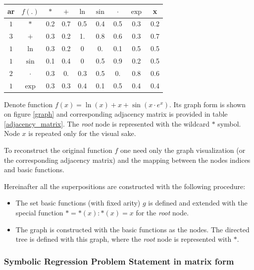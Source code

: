 \documentclass[11pt, tightenlines, twoside, onecolumn, nofloats, nobibnotes, nofootinbib, superscriptaddress, noshowpacks, centertags]{revtex4}
\begin{document}
\begin{minipage}[B]{0.35\textwidth}
    \centering
        \begin{tabular}{|c|c||c|c|c|c|c|c|c|}
            \hline
            ar&$f(.)$&$\ast$&$+$&$\ln$&$\sin$&$\cdot$&$\exp$&x\\
            \hline
            $1$&$\ast$ &0.2&0.7&0.5&0.4&0.5&0.3&0.2\\
            \hline
            $3$&$+$    &0.3&0.2&1.&0.8&0.6&0.3&0.7\\
            \hline
            $1$&$\ln$  &0.3&0.2&0&0.&0.1&0.5&0.5\\
            \hline
            $1$&$\sin$ &0.1&0.4&0&0.5&0.9&0.2&0.5\\
            \hline
            $2$&$\cdot$&0.3&0.&0.3&0.5&0.&0.8&0.6\\
            \hline
            $1$&$\exp$ &0.3&0.3&0.4&0.1&0.5&0.4&0.4\\
            \hline
        \end{tabular}
    \label{restored_adjacency_matrix}
\end{minipage}

Denote function $f(x) = \ln(x) + x + \sin(x\cdot e^x)$. Its graph form is shown on figure \ref{graph} and corresponding adjacency matrix is provided in table \ref{adjacency_matrix}. The \emph{root} node is represented with the wildcard $\ast$ symbol. Node $x$ is repeated only for the visual sake.

To reconstruct the original function $f$ one need only the graph visualization (or the corresponding adjacency matrix) and the mapping between the nodes indices and basic functions.

Hereinafter all the superpositions are constructed with the following procedure:
\begin{itemize}
\item The set basic functions (with fixed arity) $g$ is defined and extended with the special function $\ast=\ast(x):\ast(x)=x$ for the \emph{root} node.
    \item The graph is constructed with the basic functions as the nodes. The directed tree is defined with this graph, where the \emph{root} node is represented with $\ast$.
\end{itemize}

\subsubsection{Symbolic Regression Problem Statement in matrix form}
\end{document}
